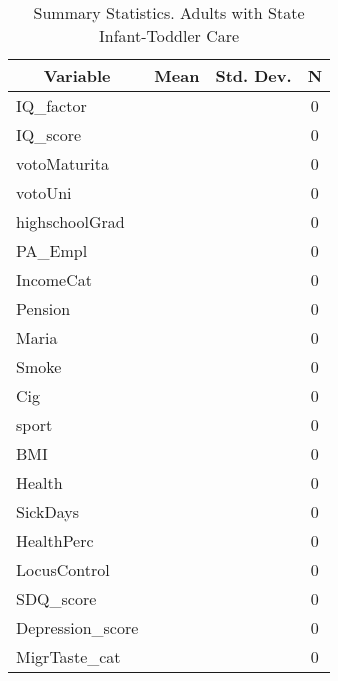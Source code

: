 
\begin{table}[htbp]\centering \caption{Summary Statistics. Adults with State Infant-Toddler Care \label{schoolAdultasiloStat}}
\begin{tabular}{l c c  c}\hline\hline
\multicolumn{1}{c}{\textbf{Variable}} & \textbf{Mean}
 & \textbf{Std. Dev.} & \textbf{N}\\ \hline
IQ\_factor &  &   & 0\\
IQ\_score &  &   & 0\\
votoMaturita &  &   & 0\\
votoUni &  &   & 0\\
highschoolGrad &  &   & 0\\
PA\_Empl &  &   & 0\\
IncomeCat &  &   & 0\\
Pension &  &   & 0\\
Maria &  &   & 0\\
Smoke &  &   & 0\\
Cig &  &   & 0\\
sport &  &   & 0\\
BMI &  &   & 0\\
Health &  &   & 0\\
SickDays &  &   & 0\\
HealthPerc &  &   & 0\\
LocusControl &  &   & 0\\
SDQ\_score &  &   & 0\\
Depression\_score &  &   & 0\\
MigrTaste\_cat &  &   & 0\\
\hline\end{tabular}
\end{table}
